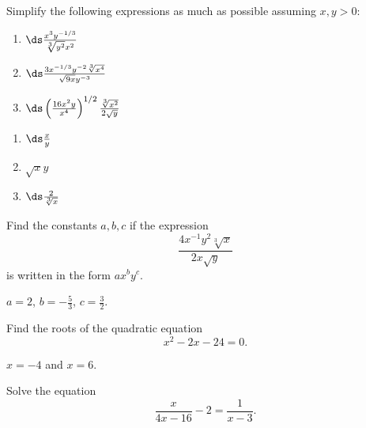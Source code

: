 \begin{enumialphparenastyle}

\begin{ex}
Simplify the following expressions as much as possible assuming $x,y>0$:
\begin{enumerate}
	\item	$\ds\frac{x^3y^{-1/3}}{\sqrt[3]{y^2}x^2}$
	\item	$\ds\frac{3x^{-1/3}y^{-2}\sqrt[3]{x^4}}{\sqrt{9x}y^{-3}}$
	\item	$\ds\left(\frac{16x^2y}{x^4}\right)^{1/2}\frac{\sqrt[3]{x^2}}{2\sqrt{y}}$
\end{enumerate}
\begin{sol}
\begin{enumerate}
	\item	$\ds\frac{x}{y}$
	\item	$\sqrt{x}y$
	\item	$\ds\frac{2}{\sqrt[3]{x}}$
\end{enumerate}
\end{sol}
\end{ex}

\begin{ex}
Find the constants $a,b,c$ if the expression
$$\frac{4x^{-1}y^2\sqrt[3]{x}}{2x\sqrt{y}}$$
is written in the form $ax^by^c$.
\begin{sol}
	$a=2$, $b=-\frac{5}{3}$, $c=\frac{3}{2}$. 
\end{sol}
\end{ex}

\begin{ex}
Find the roots of the quadratic equation
$$x^2-2x-24=0.$$
\begin{sol}
$x=-4$ and $x=6$.
\end{sol}
\end{ex}

\begin{ex}
Solve the equation $$\frac{x}{4x-16}-2=\frac{1}{x-3}.$$
\end{ex}


\end{enumialphparenastyle}
